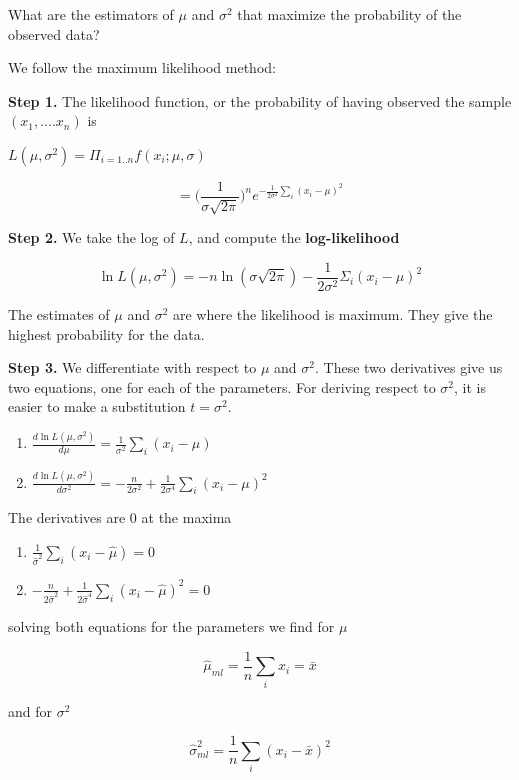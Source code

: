 \documentclass[
]{book}
\providecommand{\tightlist}{%
  \setlength{\itemsep}{0pt}\setlength{\parskip}{0pt}}
\begin{document}
What are the estimators of \(\mu\) and \(\sigma^2\) that maximize the probability of the observed data?

We follow the maximum likelihood method:

\textbf{Step 1.} The likelihood function, or the probability of having observed the sample \((x_1, ....x_n)\) is

\(L(\mu, \sigma^2)=\Pi_{i=1..n} f(x_i;\mu,\sigma)\)

\[=\big( \frac{1}{\sigma \sqrt{2 \pi}}\big)^n e^{-\frac{1}{2\sigma^2} \sum_i(x_i-\mu)^2}\]

\textbf{Step 2.} We take the log of \(L\), and compute the \textbf{log-likelihood}

\[\ln L(\mu, \sigma^2)=-n \ln(\sigma \sqrt{2 \pi})-\frac{1}{2\sigma^2} \Sigma_i(x_i-\mu)^2\]

The estimates of \(\mu\) and \(\sigma^2\) are where the likelihood is maximum. They give the highest probability for the data.

\textbf{Step 3.} We differentiate with respect to \(\mu\) and \(\sigma^2\). These two derivatives give us two equations, one for each of the parameters. For deriving respect to \(\sigma^2\), it is easier to make a substitution \(t=\sigma^2\).

\begin{enumerate}
\def\labelenumi{\alph{enumi})}
\item
  \(\frac{d \ln L(\mu, \sigma^2)}{d\mu}=\frac{1}{\sigma^2} \sum_i(x_i-\mu)\)
\item
  \(\frac{d \ln L(\mu, \sigma^2)}{d\sigma^2}=-\frac{n}{2 \sigma^2}+\frac{1}{2\sigma^4} \sum_i(x_i-\mu)^2\)
\end{enumerate}

The derivatives are \(0\) at the maxima

\begin{enumerate}
\def\labelenumi{\alph{enumi})}
\tightlist
\item
  \(\frac{1}{\hat{\sigma}^2} \sum_i(x_i-\hat{\mu})=0\)
\item
  \(-\frac{n}{2 \hat{\sigma}^2}+\frac{1}{2\hat{\sigma}^4} \sum_i(x_i-\hat{\mu})^2=0\)
\end{enumerate}

solving both equations for the parameters we find for \(\mu\)

\[\hat{\mu}_{ml}=\frac{1}{n}\sum_i x_i=\bar{x}\]

and for \(\sigma^2\)

\[\hat{\sigma}^2_{ml}=\frac{1}{n}\sum_i(x_i-\bar{x})^2\]
\end{document}
